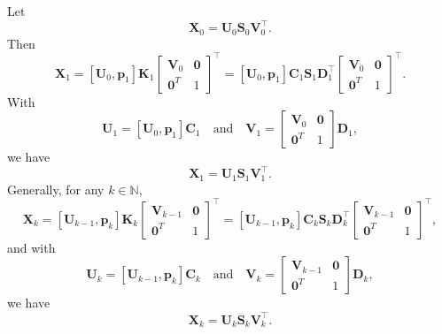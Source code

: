 \documentclass[11pt,a4paper]{article}
\newcommand{\0}{\M{0}}
\newcommand{\M}[1]{\mathbf{#1}}
\newcommand{\N}{\mathbb{N}}
\newcommand{\T}{\top}
\newcommand{\ve}[1]{\mathbf{#1}}
\begin{document}
Let
\begin{displaymath}
  \M{X}_0 = \M{U}_0 \M{S}_0 \M{V}_0^\T.
\end{displaymath}
Then
\begin{displaymath}
  \M{X}_1
  = [\M{U}_0, \ve{p}_1] \M{K}_1
  \begin{bmatrix}
    \M{V}_0 & \0
    \\
    \0^T & 1
  \end{bmatrix}^\T
  =
  [\M{U}_0, \ve{p}_1] \M{C}_1 \M{S}_1 \M{D}_1^\T
  \begin{bmatrix}
    \M{V}_0 & \0
    \\
    \0^T & 1
  \end{bmatrix}^\T.
 \end{displaymath}
With
\begin{displaymath}
  \M{U}_1 =  [\M{U}_0, \ve{p}_1] \M{C}_1
  \quad
  \text{and}
  \quad
  \M{V}_1 =
  \begin{bmatrix}
    \M{V}_0 & \0
    \\
    \0^T & 1
  \end{bmatrix}
  \M{D}_1,
\end{displaymath}
we have
\begin{displaymath}
  \M{X}_1 =   \M{U}_1 \M{S}_1 \M{V}_1^\T.
\end{displaymath}
Generally, for any $k \in \N$, 
\begin{displaymath}
  \M{X}_k
  =
  [\M{U}_{k-1}, \ve{p}_k] \M{K}_k
  \begin{bmatrix}
    \M{V}_{k-1} & \0
    \\
    \0^T & 1
  \end{bmatrix}^\T
  =
  [\M{U}_{k-1}, \ve{p}_k] \M{C}_k \M{S}_k \M{D}_k^\T
   \begin{bmatrix}
    \M{V}_{k-1} & \0
    \\
    \0^T & 1
  \end{bmatrix}^\T,
\end{displaymath}
and with
\begin{displaymath}
  \M{U}_k =  [\M{U}_{k-1}, \ve{p}_k] \M{C}_k
  \quad
  \text{and}
  \quad
  \M{V}_k
  =
  \begin{bmatrix}
    \M{V}_{k-1} & \0
    \\
    \0^T & 1
  \end{bmatrix}
  \M{D}_k,
\end{displaymath}
we have
\begin{displaymath}
  \M{X}_k =  \M{U}_k \M{S}_k \M{V}_k^\T.
\end{displaymath}
\end{document}
